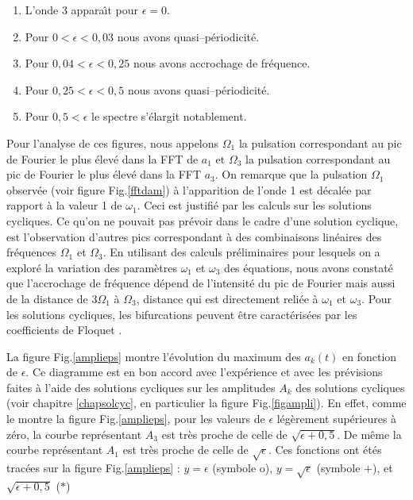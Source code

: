 \documentclass{book}
\begin{document}
\begin{enumerate}
\item L'onde 3 appara\^\i t pour $\epsilon=0$.
\item Pour $0<\epsilon<0,03$ nous avons quasi--p\'eriodicit\'e.
\item Pour  $0,04<\epsilon<0,25$ nous avons accrochage de fr\'equence.
\item Pour  $0,25<\epsilon<0,5$  nous avons quasi--p\'eriodicit\'e.
\item Pour  $0,5<\epsilon$  le spectre s'\'elargit notablement.
\end{enumerate}

Pour l'analyse de ces figures, nous appelons $\Omega_1$
la pulsation correspondant au pic de Fourier le plus \'elev\'e dans la FFT
de  $a_1$ et  $\Omega_3$ la pulsation correspondant au pic de Fourier
le plus \'elev\'e dans la FFT $a_3$. 
On remarque que la pulsation $\Omega_1$ observ\'ee (voir figure
Fig.\ref{fftdam})  \`a l'apparition de
l'onde 1 est d\'ecal\'ee par rapport \`a la valeur 1 de $\omega_1$.
Ceci est justifi\'e par les calculs sur les 
solutions cycliques.
Ce qu'on ne pouvait pas pr\'evoir dans le cadre d'une solution cyclique,
est l'observation  d'autres pics correspondant \`a des combinaisons
lin\'eaires des fr\'equences $\Omega_1$ et $\Omega_3$.
En utilisant des calculs pr\'eliminaires pour lesquels on a explor\'e la
variation des param\`etres $\omega_1$ et $\omega_3$ des \'equations, nous
avons constat\'e que l'accrochage de fr\'equence d\'epend de
l'intensit\'e du 
pic de Fourier mais aussi de la distance de $3\Omega_1$ \`a $\Omega_3$,
distance qui est directement reli\'ee \`a $\omega_1$ et $\omega_3$.
Pour les solutions cycliques, les bifurcations peuvent \^etre
caract\'eris\'ees par les coefficients de Floquet
\cite{Parker89,Fairgrieve91}. 

La figure Fig.\ref{amplieps} montre l'\'evolution du maximum des
$a_k(t)$ en fonction de $\epsilon$. Ce diagramme est en bon accord avec
l'exp\'erience et 
avec les pr\'evisions faites \`a l'aide des solutions cycliques sur
les amplitudes $A_k$ des solutions cycliques (voir
chapitre \ref{chapsolcyc}, en particulier la figure
Fig.\ref{figampli}). En effet, comme le montre la figure
Fig.\ref{amplieps}, pour les valeurs de $\epsilon$ 
l\'eg\`erement sup\'erieures \`a z\'ero, la courbe repr\'esentant
$A_3$ est tr\`es proche de celle de $\sqrt{\epsilon+0,5}$. De m\^eme
la courbe repr\'esentant $A_1$ est tr\`es proche de celle de
$\sqrt{\epsilon}$. Ces fonctions ont \'et\'es 
trac\'ees sur la figure Fig.\ref{amplieps} :  $y=\epsilon$ (symbole o),
$y=\sqrt\epsilon$ (symbole $+$), et $\sqrt{\epsilon+0,5}$ ($\ast$)
\end{document}
